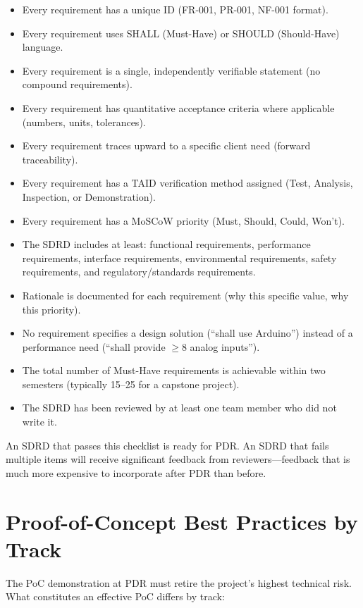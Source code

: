 \begin{itemize}[nosep,leftmargin=1.5em]
\item Every requirement has a unique ID (FR-001, PR-001, NF-001 format).
\item Every requirement uses SHALL (Must-Have) or SHOULD (Should-Have) language.
\item Every requirement is a single, independently verifiable statement (no compound requirements).
\item Every requirement has quantitative acceptance criteria where applicable (numbers, units, tolerances).
\item Every requirement traces upward to a specific client need (forward traceability).
\item Every requirement has a TAID verification method assigned (Test, Analysis, Inspection, or Demonstration).
\item Every requirement has a MoSCoW priority (Must, Should, Could, Won't).
\item The SDRD includes at least: functional requirements, performance requirements, interface requirements, environmental requirements, safety requirements, and regulatory/standards requirements.
\item Rationale is documented for each requirement (why this specific value, why this priority).
\item No requirement specifies a design solution (``shall use Arduino'') instead of a performance need (``shall provide $\geq$8 analog inputs'').
\item The total number of Must-Have requirements is achievable within two semesters (typically 15--25 for a capstone project).
\item The SDRD has been reviewed by at least one team member who did not write it.
\end{itemize}

An SDRD that passes this checklist is ready for PDR. An SDRD that fails multiple items will receive significant feedback from reviewers---feedback that is much more expensive to incorporate after PDR than before.



\section{Proof-of-Concept Best Practices by Track}
The PoC demonstration at PDR must retire the project's highest technical risk. What constitutes an effective PoC differs by track:

